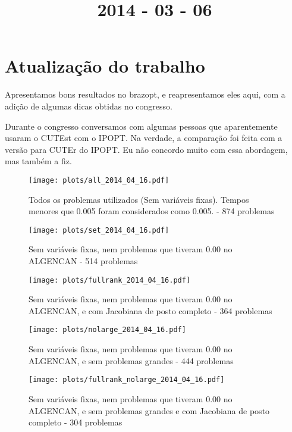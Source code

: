 \documentclass{article}
\title{2014 - 03 - 06}
\author{}
\date{}
\begin{document}
\maketitle
\section{Atualização do trabalho}

Apresentamos bons resultados no brazopt, e reapresentamos eles aqui, com a
adição de algumas dicas obtidas no congresso.

Durante o congresso conversamos com algumas pessoas que aparentemente usaram o
CUTEst com o IPOPT. Na verdade, a comparação foi feita com a versão para CUTEr
do IPOPT. Eu não concordo muito com essa abordagem, mas também a fiz.

\begin{figure}[H]
  \centering
  \texttt{[image: plots/all\_2014\_04\_16.pdf]}
  \caption{Todos os problemas utilizados (Sem variáveis fixas). Tempos menores
    que 0.005 foram considerados como 0.005. - 874 problemas}
\end{figure}
\begin{figure}[H]
  \centering
  \texttt{[image: plots/set\_2014\_04\_16.pdf]}
  \caption{Sem variáveis fixas, nem problemas
    que tiveram 0.00 no ALGENCAN - 514 problemas}
\end{figure}
\begin{figure}[H]
  \centering
  \texttt{[image: plots/fullrank\_2014\_04\_16.pdf]}
  \caption{Sem variáveis fixas, nem problemas
    que tiveram 0.00 no ALGENCAN, e com Jacobiana de posto completo - 364
    problemas}
\end{figure}
\begin{figure}[H]
  \centering
  \texttt{[image: plots/nolarge\_2014\_04\_16.pdf]}
  \caption{Sem variáveis fixas, nem problemas
    que tiveram 0.00 no ALGENCAN, e sem problemas grandes - 444 problemas}
\end{figure}
\begin{figure}[H]
  \centering
  \texttt{[image: plots/fullrank\_nolarge\_2014\_04\_16.pdf]}
  \caption{Sem variáveis fixas, nem problemas
    que tiveram 0.00 no ALGENCAN, e sem problemas grandes e com Jacobiana de
    posto completo - 304 problemas}
\end{figure}
\end{document}
